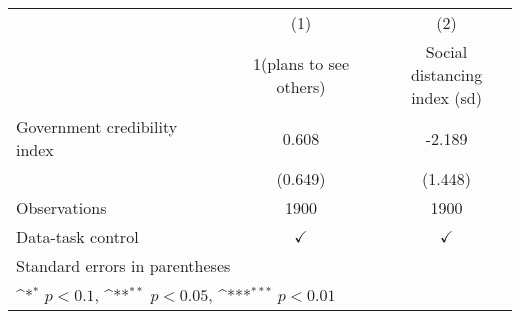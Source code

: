 {
\def\sym#1{\ifmmode^{#1}\else\(^{#1}\)\fi}
\begin{tabular}{l*{2}{c}}
\hline\hline
                    &\multicolumn{1}{c}{(1)}         &\multicolumn{1}{c}{(2)}         \\
                    &1(plans to see others)         &\shortstack{Social distancing \\ index (sd)}         \\
\hline
Government credibility index&       0.608         &      -2.189         \\
                    &     (0.649)         &     (1.448)         \\
\hline
Observations        &        1900         &        1900         \\
Data-task control   &$\checkmark$         &$\checkmark$         \\
\hline\hline
\multicolumn{3}{l}{\footnotesize Standard errors in parentheses}\\
\multicolumn{3}{l}{\footnotesize \sym{*} \(p<0.1\), \sym{**} \(p<0.05\), \sym{***} \(p<0.01\)}\\
\end{tabular}
}
